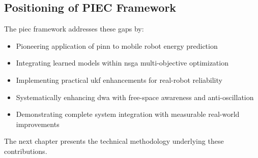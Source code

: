 \subsection{Positioning of PIEC Framework}

The \acrshort{piec} framework addresses these gaps by:
\begin{itemize}
    \item Pioneering application of \acrshort{pinn} to mobile robot energy prediction
    \item Integrating learned models within \acrshort{nsga} multi-objective optimization
    \item Implementing practical \acrshort{ukf} enhancements for real-robot reliability
    \item Systematically enhancing \acrshort{dwa} with free-space awareness and anti-oscillation
    \item Demonstrating complete system integration with measurable real-world improvements
\end{itemize}

The next chapter presents the technical methodology underlying these contributions.

